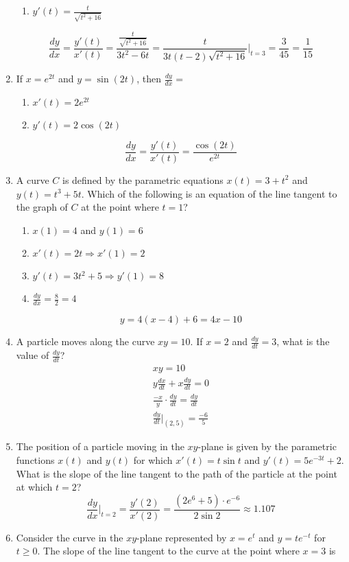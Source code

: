 \documentclass[12pt]{article}
\begin{document}
\begin{enumerate}
\begin{enumerate}
        \item $y'(t) = \frac{t}{\sqrt{t^2+16}}$
    \end{enumerate}
    $$\frac{dy}{dx} = \frac{y'(t)}{x'(t)}= \frac{\frac{t}{\sqrt{t^2+16}}}{3t^2-6t} = \frac{t}{3t(t-2)\sqrt{t^2+16}} \biggr\rvert_{t=3} = \frac{3}{45} = \boxed{\frac{1}{15}}$$
    \item If $x=e^{2t}$ and $y=\sin (2t)$, then $\frac{dy}{dx} = $
    \begin{enumerate}
        \item $x'(t) = 2e^{2t}$
        \item $y'(t) = 2\cos (2t)$
    \end{enumerate}
    $$\frac{dy}{dx} = \frac{y'(t)}{x'(t)} =\boxed{ \frac{\cos (2t)}{e^{2t}}}$$
    \item A curve $C$ is defined by the parametric equations $x(t) = 3 + t^2$ and $y(t) = t^3 + 5t$. Which of the following is an equation of the line tangent to the graph of $C$ at the point where $t = 1$?
    \begin{enumerate}
        \item $x(1) = 4$ and $y(1) = 6$
        \item $x'(t) = 2t \Longrightarrow x'(1)=2$
        \item $y'(t) = 3t^2+5 \Longrightarrow y'(1) = 8$
        \item $\frac{dy}{dx} = \frac{8}{2} = 4$
    \end{enumerate}
    $$y = 4(x-4)+6 = \boxed{4x-10}$$
    \item A particle moves along the curve $xy=10$. If $x=2$ and $\frac{dy}{dt}=3$, what is the value of $\frac{dy}{dt}$?
    \begin{align*}
        xy = 10 \\
        y \frac{dx}{dt} + x \frac{dy}{dt} = 0\\
         \frac{-x}{y} \cdot \frac{dy}{dt} = \frac{dy}{dt}\\
        \frac{dy}{dt}\biggr\rvert_{(2,5)} = \boxed{\frac{-6}{5}}
    \end{align*}
    \item The position of a particle moving in the $xy$-plane is given by the parametric functions $x(t)$ and $y(t)$ for which $x'(t)=t\sin t$ and $y'(t)=5e^{-3t}+2$. What is the slope of the line tangent to the path of the particle at the point at which $t=2$?
    $$\frac{dy}{dx}\biggr\rvert_{t=2} = \frac{y'(2)}{x'(2)} = \frac{(2e^6+5) \cdot e^{-6}}{2\sin 2}\approx \boxed{1.107}$$
    \item Consider the curve in the $xy$-plane represented by $x=e^t$ and $y=te^{-t}$ for $t \geq 0$. The slope of the line tangent to the curve at the point where $x=3$ is

\end{enumerate}
\end{document}
